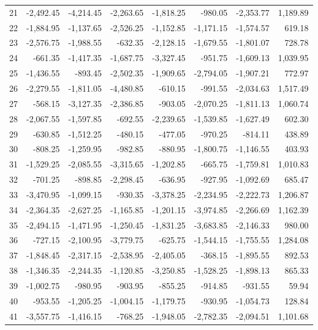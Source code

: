 \begin{longtable}{rrrrrrrr}
21 & -2,492.45 & -4,214.45 & -2,263.65 & -1,818.25 & -980.05 & -2,353.77 & 1,189.89  \\
22 & -1,884.95 & -1,137.65 & -2,526.25 & -1,152.85 & -1,171.15 & -1,574.57 & 619.18  \\
23 & -2,576.75 & -1,988.55 & -632.35 & -2,128.15 & -1,679.55 & -1,801.07 & 728.78  \\
24 & -661.35 & -1,417.35 & -1,687.75 & -3,327.45 & -951.75 & -1,609.13 & 1,039.95  \\
25 & -1,436.55 & -893.45 & -2,502.35 & -1,909.65 & -2,794.05 & -1,907.21 & 772.97  \\
26 & -2,279.55 & -1,811.05 & -4,480.85 & -610.15 & -991.55 & -2,034.63 & 1,517.49  \\
27 & -568.15 & -3,127.35 & -2,386.85 & -903.05 & -2,070.25 & -1,811.13 & 1,060.74  \\
28 & -2,067.55 & -1,597.85 & -692.55 & -2,239.65 & -1,539.85 & -1,627.49 & 602.30  \\
29 & -630.85 & -1,512.25 & -480.15 & -477.05 & -970.25 & -814.11 & 438.89  \\
30 & -808.25 & -1,259.95 & -982.85 & -880.95 & -1,800.75 & -1,146.55 & 403.93  \\
31 & -1,529.25 & -2,085.55 & -3,315.65 & -1,202.85 & -665.75 & -1,759.81 & 1,010.83  \\
32 & -701.25 & -898.85 & -2,298.45 & -636.95 & -927.95 & -1,092.69 & 685.47  \\
33 & -3,470.95 & -1,099.15 & -930.35 & -3,378.25 & -2,234.95 & -2,222.73 & 1,206.87  \\
34 & -2,364.35 & -2,627.25 & -1,165.85 & -1,201.15 & -3,974.85 & -2,266.69 & 1,162.39  \\
35 & -2,494.15 & -1,471.95 & -1,250.45 & -1,831.25 & -3,683.85 & -2,146.33 & 980.00  \\
36 & -727.15 & -2,100.95 & -3,779.75 & -625.75 & -1,544.15 & -1,755.55 & 1,284.08  \\
37 & -1,848.45 & -2,317.15 & -2,538.95 & -2,405.05 & -368.15 & -1,895.55 & 892.53  \\
38 & -1,346.35 & -2,244.35 & -1,120.85 & -3,250.85 & -1,528.25 & -1,898.13 & 865.33  \\
39 & -1,002.75 & -980.95 & -903.95 & -855.25 & -914.85 & -931.55 & 59.94  \\
40 & -953.55 & -1,205.25 & -1,004.15 & -1,179.75 & -930.95 & -1,054.73 & 128.84  \\
41 & -3,557.75 & -1,416.15 & -768.25 & -1,948.05 & -2,782.35 & -2,094.51 & 1,101.68  \\

\end{longtable}
